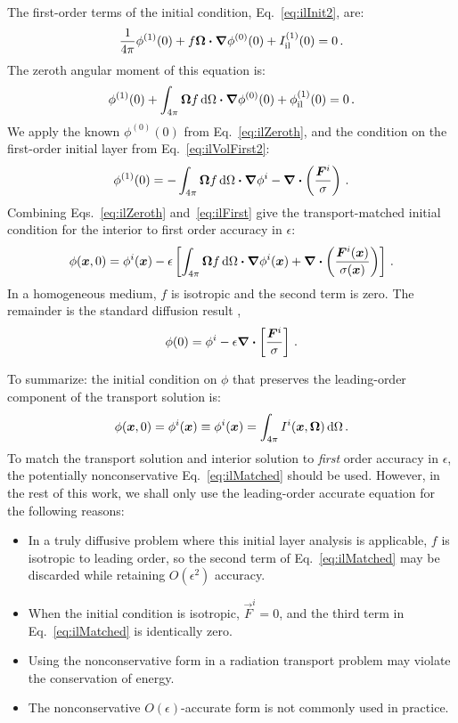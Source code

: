 The first-order terms of the initial condition, Eq.~\eqref{eq:ilInit2}, are:
\begin{equation*}
 \frac{1}{4\pi} \phi^{(1)}(0)
 + f \bm{\Omega} \bm{\cdot} \bm{\nabla} \phi^{(0)}(0)
 + I_\mathrm{il}^{(1)}(0) = 0\,.
\end{equation*}
The zeroth angular moment of this equation is:
\begin{equation}\label{eq:ilInitFirst}
 \phi^{(1)}(0)
 + \int_{4\pi}\bm{\Omega} f \mathop{}\!\mathrm{d}\Omega \bm{\cdot} \bm{\nabla} \phi^{(0)}(0)
 + \phi_\mathrm{il}^{(1)}(0) = 0\,.
\end{equation}
We apply the known $\phi^{(0)}(0)$ from
Eq.~\eqref{eq:ilZeroth}, and the condition on the first-order initial layer
from Eq.~\eqref{eq:ilVolFirst2}:
\begin{equation}\label{eq:ilFirst}
 \phi^{(1)}(0) = 
 - \int_{4\pi}\bm{\Omega} f \mathop{}\!\mathrm{d}\Omega \bm{\cdot} \bm{\nabla} \phi^i
 - \bm{\nabla} \bm{\cdot} \left(\frac{\bm{F}^i}{\sigma} \right)\,.
\end{equation}
Combining Eqs.~\eqref{eq:ilZeroth} and~\eqref{eq:ilFirst} give the
transport-matched initial condition for the interior to first order accuracy
in $\epsilon$:
\begin{equation}\label{eq:ilMatched}
  \phi(\bm{x},0) = \phi^i(\bm{x})
- \epsilon \left[ \int_{4\pi}\bm{\Omega} f \mathop{}\!\mathrm{d}\Omega \bm{\cdot} \bm{\nabla} \phi^i(\bm{x})
+ \bm{\nabla} \bm{\cdot} \left(\frac{\bm{F}^i(\bm{x})}{\sigma(\bm{x})} \right) \right]
\,.
\end{equation}
In a homogeneous medium, $f$ is isotropic and the second term is zero. The
remainder is the standard diffusion result \cite{Mal1991},
\begin{equation*}
 \phi(0) = \phi^i - \epsilon\bm{\nabla} \bm{\cdot} \left[\frac{\bm{F}^i}{\sigma} \right]\,.
\end{equation*}

To summarize: the initial condition on $\phi$ that preserves the leading-order
component of the transport solution is:
\begin{equation*}
  \phi(\bm{x},0) = \phi^i(\bm{x}) \equiv 
  \phi^i(\bm{x}) = \int_{4\pi} I^i(\bm{x},\bm{\Omega}) \mathop{}\!\mathrm{d}\Omega\,.
\end{equation*}
To match the transport solution and interior solution to \emph{first} order
accuracy in $\epsilon$, the potentially nonconservative
Eq.~\eqref{eq:ilMatched} should be used. However, in the rest of this work, we
shall only use the leading-order accurate equation for the following reasons:
\begin{itemize}
  \item In a truly diffusive problem where this initial layer analysis is
    applicable, $f$ is isotropic to leading order, so the second term of
    Eq.~\eqref{eq:ilMatched} may be discarded while retaining $O(\epsilon^2)$
    accuracy.
  \item When the initial condition is isotropic, $\vec{F}^i=0$, and the third
    term in Eq.~\eqref{eq:ilMatched} is identically zero.
  \item Using the nonconservative form in a radiation transport problem may
    violate the conservation of energy.
  \item The nonconservative $O(\epsilon)$-accurate form is not commonly used in
    practice.
\end{itemize}


